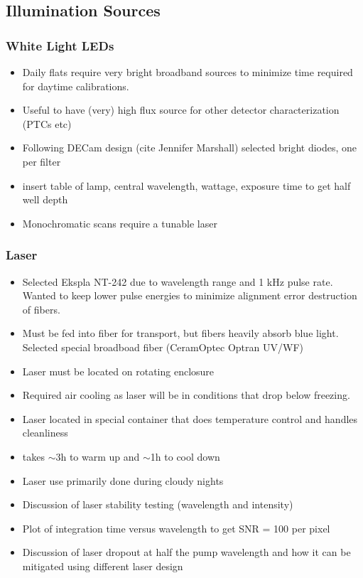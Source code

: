 \subsection{Illumination Sources} 

\subsubsection{White Light LEDs}

\begin{itemize}
	\item Daily flats require very bright broadband sources to minimize time required for daytime calibrations.
	\item Useful to have (very) high flux source for other detector characterization (PTCs etc)
	\item Following DECam design (cite Jennifer Marshall) selected bright diodes, one per filter 
	\item insert table of lamp, central wavelength, wattage, exposure time to get half well depth
	\item Monochromatic scans require a tunable laser
\end{itemize}
	
\subsubsection{Laser}
\label{sec:laser}


\begin{itemize}
	\item Selected Ekspla NT-242 due to wavelength range and 1 kHz pulse rate. Wanted to keep lower pulse energies to minimize alignment error destruction of fibers.
	\item Must be fed into fiber for transport, but fibers heavily absorb blue light. Selected special broadboad fiber (CeramOptec Optran UV/WF)
	\item Laser must be located on rotating enclosure
	\item Required air cooling as laser will be in conditions that drop below freezing. 
	\item Laser located in special container that does temperature control and handles cleanliness
	\item takes $\sim$3h to warm up and $\sim$1h to cool down
	\item Laser use primarily done during cloudy nights
	\item Discussion of laser stability testing (wavelength and intensity)
	\item Plot of integration time versus wavelength to get SNR = 100 per pixel
	\item Discussion of laser dropout at half the pump wavelength and how it can be mitigated using different laser design
\end{itemize}



